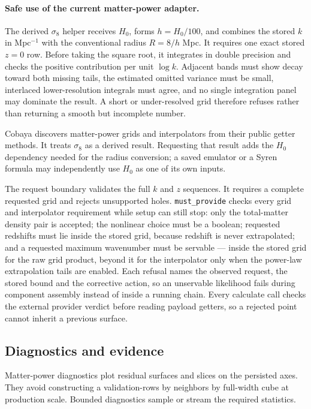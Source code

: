 \documentclass[10pt,aps,prd,twocolumn,nofootinbib]{revtex4-2}
\newcommand{\code}[1]{\texttt{#1}}
\begin{document}
\paragraph{Safe use of the current matter-power adapter.}
The derived \(\sigma_8\) helper receives \(H_0\), forms \(h=H_0/100\), and
combines the stored \(k\) in Mpc\(^{-1}\) with the conventional radius
\(R=8/h\) Mpc.  It requires one exact stored \(z=0\) row.  Before taking the
square root, it integrates in double precision and checks the positive
contribution per unit \(\log k\).  Adjacent bands must show decay toward both
missing tails, the estimated omitted variance must be small, interlaced
lower-resolution integrals must agree, and no single integration panel may
dominate the result.  A short or under-resolved grid therefore refuses rather
than returning a smooth but incomplete number.

Cobaya discovers matter-power grids and interpolators from their public getter
methods.  It treats \(\sigma_8\) as a derived result.  Requesting that result
adds the \(H_0\) dependency needed for the radius conversion; a saved emulator
or a Syren formula may independently use \(H_0\) as one of its own inputs.

The request boundary validates the full \(k\) and \(z\) sequences.  It requires
a complete requested grid and rejects unsupported holes.  \code{must\_provide}
checks every grid and interpolator requirement while setup can still stop:
only the total-matter density pair is accepted; the nonlinear choice must
be a boolean; requested redshifts must lie inside the stored grid, because
redshift is never extrapolated; and a requested maximum wavenumber must be
servable — inside the stored grid for the raw grid product, beyond it for
the interpolator only when the power-law extrapolation tails are enabled.
Each refusal names the observed request, the stored bound and the
corrective action, so an unservable likelihood fails during component
assembly instead of inside a running chain.  Every calculate
call checks the external provider verdict
before reading payload getters, so a rejected point cannot inherit a previous
surface.

\subsection{Diagnostics and evidence}

Matter-power diagnostics plot residual surfaces and slices on the persisted
axes.  They avoid constructing a validation-rows by neighbors by full-width
cube at production scale.  Bounded diagnostics sample or stream the required
statistics.
\end{document}
